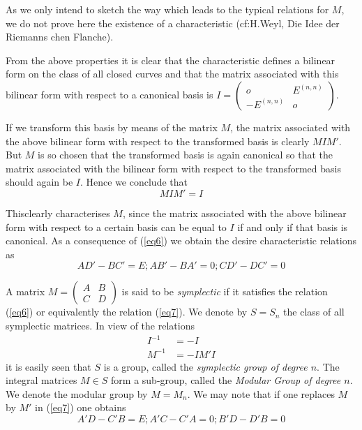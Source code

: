 As we only intend to sketch the way which leads to the typical
relations for $M$, we do not prove here the existence of a
characteristic (cf:H.Weyl, Die Idee der Riemanns chen Flanche). 

From the above properties it is clear that the characteristic defines
a bilinear form on the class of all closed curves and that the matrix
associated with this bilinear form with respect to a canonical basis
is $I = \begin{pmatrix}
  o & E^{(n,n)}\\ 
-E^{(n,n)} &  o
  \end{pmatrix}$. 

If we transform this basis by means of the matrix $M$, the matrix
associated with the above bilinear form with respect to the
transformed basis is clearly $MIM'$. But $M$ is so chosen that the
transformed basis is again canonical so that the matrix associated
with the bilinear form with respect to the transformed basis should
again be $I$. Hence we conclude that  
\begin{equation*}
M   I   M' = I \tag{6}\label{eq6}
\end{equation*}

This\pageoriginale clearly characterises $M$, since the matrix
associated with the 
above bilinear form with respect to a certain basis can be equal to
$I$ if and only if that basis is canonical. As a consequence of (\ref{eq6})
we obtain the desire characteristic relations as  
\begin{equation*}
AD' - BC' = E ; AB' - BA' = 0; CD' - DC' = 0 \tag{7}\label{eq7}
\end{equation*}

A matrix $M = \begin{pmatrix} A & B \\ C & D \end{pmatrix}$ is said to
be \textit{symplectic} if it satisfies the relation (\ref{eq6}) or
equivalently the relation (\ref{eq7}). We denote by $S = S_n$ the class of
all symplectic matrices. In view of the relations  
\begin{align*}
I^{-1} & = -I\\
M^{-1} & = -I M' I \tag{8}\label{eq8}
\end{align*}
it is easily seen that $S$ is a group, called the \textit{symplectic
  group of degree $n$}. The integral matrices $M   \in   S$ form a
sub-group, called the \textit{Modular Group of degree $n$}. We
denote the modular group by $M = M_n$. We may note that if one
replaces $M$ by $M'$ in (\ref{eq7}) one obtains 
\begin{equation*}
A'D - C'B = E; A'C - C'A = 0; B'D - D'B = 0 \tag{9}\label{eq9}
\end{equation*}

